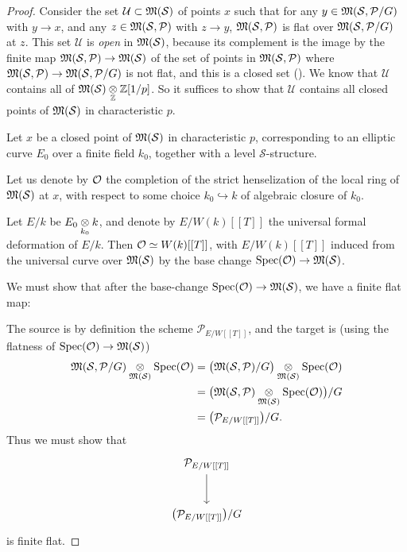 \begin{proof}
Consider the set $\mathcal{U} \subset \mathfrak{M}(\mathcal{S})$ of points $x$ such that for any $y \in \mathfrak{M}(\mathcal{S}, \mathcal{P}/G)$ with $y \to x$, and any $z \in \mathfrak{M}(\mathcal{S}, \mathcal{P})$ with $z \to y$, $\mathfrak{M}(\mathcal{S}, \mathcal{P})$ is flat over $\mathfrak{M}(\mathcal{S}, \mathcal{P}/G)$ at $z$. This set $\mathcal{U}$ is \emph{open} in $\mathfrak{M}(\mathcal{S})$, because its complement is the image by the finite map $\mathfrak{M}(\mathcal{S}, \mathcal{P}) \to \mathfrak{M}(\mathcal{S})$ of the set of points in $\mathfrak{M}(\mathcal{S}, \mathcal{P})$ where $\mathfrak{M}(\mathcal{S}, \mathcal{P}) \to \mathfrak{M}(\mathcal{S}, \mathcal{P}/G)$ is not flat, and this is a closed set (\cite[V, 5.5]{AK1}). We know that $\mathcal{U}$ contains all of $\mathfrak{M}(\mathcal{S}) \underset{\mathbb{Z}}{\otimes} \mathbb{Z}[1/p]$. So it suffices to show that $\mathcal{U}$ contains all closed points of $\mathfrak{M}(\mathcal{S})$ in characteristic $p$.

Let $x$ be a closed point of $\mathfrak{M}(\mathcal{S})$ in characteristic $p$, corresponding to an elliptic curve $E_0$ over a finite field $k_0$, together with a level $\mathcal{S}$-structure.

Let us denote by $\mathcal{O}$ the completion of the strict henselization of the local ring of $\mathfrak{M}(\mathcal{S})$ at $x$, with respect to some choice $k_0 \hookrightarrow k$ of algebraic closure of $k_0$.

Let $E/k$ be $E_0 \underset{k_0}{\otimes} k$, and denote by $E/W(k)[[T]]$ the universal formal deformation of $E/k$. Then $\mathcal{O} \simeq W(k)[[T]]$, with $E/W(k)[[T]]$ induced from the universal curve over $\mathfrak{M}(\mathcal{S})$ by the base change $\operatorname{Spec}(\mathcal{O}) \to \mathfrak{M}(\mathcal{S})$.

We must show that after the base-change $\operatorname{Spec}(\mathcal{O}) \to \mathfrak{M}(\mathcal{S})$, we have a finite flat map:
\begin{center}
\footnotesize
{}
\end{center}
The source is by definition the scheme $\mathcal{P}_{E/W[[T]]}$, and the target is (using the flatness of $\operatorname{Spec}(\mathcal{O}) \to \mathfrak{M}(\mathcal{S})$)
\begin{align*}
\mathfrak{M}(\mathcal{S}, \mathcal{P}/G) \underset{\mathfrak{M}(\mathcal{S})}{\otimes} \operatorname{Spec}(\mathcal{O}) &= \bigl(\mathfrak{M}(\mathcal{S}, \mathcal{P})/G\bigr) \underset{\mathfrak{M}(\mathcal{S})}{\otimes} \operatorname{Spec}(\mathcal{O}) \\
&= \bigl(\mathfrak{M}(\mathcal{S}, \mathcal{P}) \underset{\mathfrak{M}(\mathcal{S})}{\otimes} \operatorname{Spec}(\mathcal{O})\bigr)/G \\
&= \bigl(\mathcal{P}_{E/W[[T]]}\bigr)/G .
\end{align*}
Thus we must show that
\[
\begin{tikzcd}[column sep=large, row sep=large]
\mathcal{P}_{E/W[[T]]} \arrow[d] \\
\bigl(\mathcal{P}_{E/W[[T]]}\bigr)/G
\end{tikzcd}
\]
is finite flat.


\end{proof}
